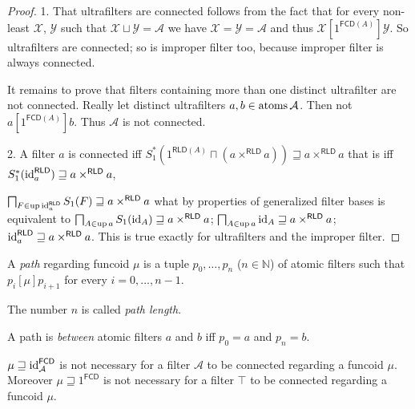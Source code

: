 \begin{proof}
  1. That ultrafilters are connected follows from the fact that for every
  non-least $\mathcal{X}$, $\mathcal{Y}$ such that $\mathcal{X} \sqcup
  \mathcal{Y} = \mathcal{A}$ we have $\mathcal{X} = \mathcal{Y} = \mathcal{A}$
  and thus $\mathcal{X} \mathrel{[1^{\mathsf{FCD} (A)}]} \mathcal{Y}$.
  So ultrafilters are connected; so is improper filter too, because improper
  filter is always connected.

  It remains to prove that filters containing more than one distinct
  ultrafilter are not connected. Really let distinct ultrafilters $a, b \in
  \operatorname{atoms} \mathcal{A}$. Then not $a \mathrel{[1^{\mathsf{FCD}
  (A)}]} b$. Thus $\mathcal{A}$ is not connected.

  2. A filter $a$ is connected iff $S^{\ast}_1 (1^{\mathsf{RLD} (A)}
  \sqcap (a \times^{\mathsf{RLD}} a)) \sqsupseteq a
  \times^{\mathsf{RLD}} a$ that is iff $S^{\ast}_1
  (\operatorname{id}^{\mathsf{RLD}}_a) \sqsupseteq a
  \times^{\mathsf{RLD}} a$,

  $\bigsqcap_{F \in \operatorname{up} \operatorname{id}^{\mathsf{RLD}}_a} S_1 (F)
  \sqsupseteq a \times^{\mathsf{RLD}} a$ what by properties of
  generalized filter bases is equivalent to $\bigsqcap_{A \in \operatorname{up} a} S_1
  (\operatorname{id}_A) \sqsupseteq a \times^{\mathsf{RLD}} a$; $\bigsqcap_{A
  \in \operatorname{up} a} \operatorname{id}_A \sqsupseteq a \times^{\mathsf{RLD}} a$;
  $\operatorname{id}^{\mathsf{RLD}}_a \sqsupseteq a
  \times^{\mathsf{RLD}} a$. This is true exactly for ultrafilters and
  the improper filter.
\end{proof}

\begin{defn}
  A \emph{path} regarding funcoid $\mu$ is a tuple $p_0, \ldots, p_n$ ($n
  \in \mathbb{N}$) of atomic filters such that $p_i \mathrel{[\mu]} p_{i +
  1}$ for every $i = 0, \ldots, n - 1$.

  The number $n$ is called \emph{path length}.

  A path is \emph{between} atomic filters $a$ and $b$ iff $p_0 = a$ and
  $p_n = b$.
\end{defn}

\begin{example}
  $\mu \sqsupseteq \operatorname{id}^{\mathsf{FCD}}_{\mathcal{A}}$ is not
  necessary for a filter $\mathcal{A}$ to be connected regarding a funcoid
  $\mu$. Moreover $\mu \sqsupseteq 1^{\mathsf{FCD}}$ is not necessary
  for a filter $\top$ to be connected regarding a funcoid $\mu$.
\end{example}


